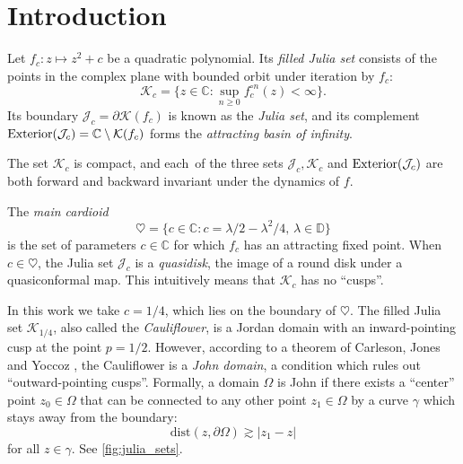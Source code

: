 

\usepackage{subcaption}



\section{Introduction}

% 

Let $f_c: z\mapsto z^2 + c$ be a quadratic polynomial. Its {\em filled Julia set} consists of the points in the complex plane with bounded orbit
under iteration by $f_c$:
$$
\mathcal K_c = \{z \in \mathbb{C} : \sup_{n \ge 0} f_c^{\circ n}(z) < \infty \}.
$$
Its boundary $\mathcal J_c = \partial \mathcal K(f_c)$ is known as the {\em Julia set}, and its complement $\operatorname{Exterior}(\mathcal{J}_c) = \mathbb{C} \setminus \mathcal K(f_c)$ forms the {\em attracting basin of infinity}. 

The set $\mathcal K_c$ is compact, and each\
  of the three sets
$\mathcal J_c, \mathcal K_c$ and $\operatorname{Exterior}(\mathcal{J}_c)$ are both forward and backward invariant under the dynamics of $f$.
 
The {\em main cardioid}
$$
\heartsuit = \bigl  \{c \in \mathbb{C}: c = \lambda/2 - \lambda^2/4,\, \lambda \in \mathbb{D} \bigr \}
$$
is the set of parameters $c \in \mathbb{C}$ for which $f_c$ has an attracting fixed point.
When $c \in \heartsuit$, the Julia set $\mathcal J_c$ is a \emph{quasidisk}, the image of a round disk under a quasiconformal map.
This intuitively means that $\mathcal K_c$ has no \enquote{cusps}.



In this work we take $c=1/4$, which lies on the boundary of $\heartsuit$. 
The filled Julia set $\mathcal K_{1/4}$, also called the \emph{Cauliflower}, 
is a Jordan domain with an inward-pointing cusp at the point $p=1/2$. However, according to a theorem of Carleson, Jones and Yoccoz \cite[Theorem 6.1]{carleson_julia_1994}, 
the Cauliflower is a \emph{John domain}, a condition which rules out \enquote{outward-pointing cusps}. 
Formally, a domain $\Omega$ is John if there exists a \enquote{center} point 
$z_0 \in \Omega$ that can be connected 
to any other point $z_1\in \Omega$ by a curve $\gamma$ which stays away from the boundary:
\begin{equation}
	\mathrm{dist}(z, \partial \Omega) \gtrsim |z_1-z|
\end{equation} for all $z\in \gamma$.
 See \cref{fig:julia_sets}.

